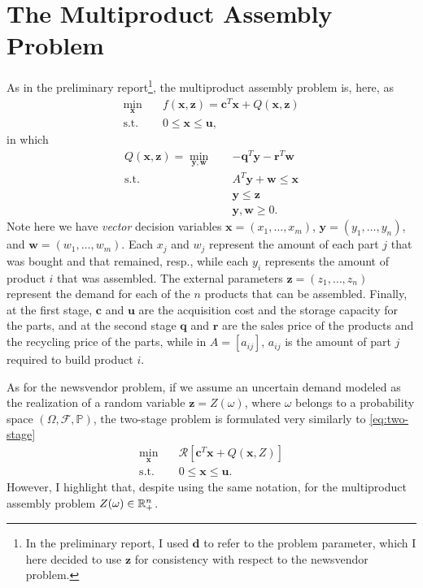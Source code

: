 \documentclass[12pt]{article}
\begin{document}
\section*{The Multiproduct Assembly Problem}

As in the preliminary report\footnote{In the preliminary report, I used $\bm{d}$ to refer to the problem parameter, which I here decided to use $\bm{z}$ for consistency with respect to the newsvendor problem.}, the multiproduct assembly problem is, here, as
\begin{align*}
    \min_{\bm{x}} \quad & f(\bm{x},\bm{z}) = \bm{c}^{T} \bm{x} + Q(\bm{x}, \bm{z}) \\
    \textrm{s.t.} \quad & 0 \le \bm{x} \le \bm{u}
,\end{align*}
in which
\begin{align*}
    Q(\bm{x},\bm{z}) = \min_{\bm{y},\bm{w}} \quad & -\bm{q}^{T} \bm{y} - \bm{r}^{T}\bm{w} \\
    \textrm{s.t.} \quad & A^{T}\bm{y} + \bm{w} \le \bm{x} \\
      & \bm{y} \le \bm{z} \\
      & \bm{y}, \bm{w} \ge 0
.\end{align*}
Note here we have \emph{vector} decision variables $\bm{x}=(x_1,\ldots,x_m)$, $\bm{y}=(y_1,\ldots,y_{n})$, and $\bm{w}=(w_1,\ldots,w_m)$.
Each $x_{j}$ and $w_j$ represent the amount of each part $j$ that was bought and that remained, resp., while each $y_{i}$ represents the amount of product $i$ that was assembled.
The external parameters $\bm{z}=(z_1,\ldots,z_n)$ represent the demand for each of the $n$ products that can be assembled.
Finally, at the first stage,  $\bm{c}$ and $\bm{u}$ are the acquisition cost and the storage capacity for the parts, and at the second stage $\bm{q}$ and $\bm{r}$ are the sales price of the products and the recycling price of the parts, while in $A=[a_{ij}]$, $a_{ij}$ is the amount of part $j$ required to build product $i$.

As for the newsvendor problem, if we assume an uncertain demand modeled as the realization of a random variable $\bm{z} = Z(\omega)$, where $\omega$ belongs to a probability space $\left( \Omega, \mathcal{F}, \mathbb{P} \right)$, the two-stage problem is formulated very similarly to \eqref{eq:two-stage}
\begin{equation}\label{eq:two-stage-ndim}
\begin{split}
    \min_{\bm{x}} \quad & \mathcal{R}[\bm{c}^{T}\bm{x} + Q(\bm{x},Z)] \\
    \textrm{s.t.} \quad & 0\le \bm{x}\le \bm{u}
.\end{split}
\end{equation}
However, I highlight that, despite using the same notation, for the multiproduct assembly problem $Z(\omega)\in \mathbb{R}^{n}_{+}$.
\end{document}

